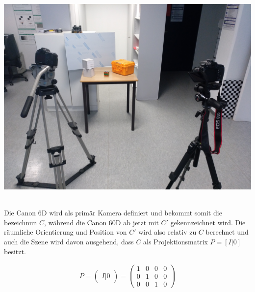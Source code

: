 \begin{minipage}{\linewidth}
	\centering
	\includegraphics[width=.7\linewidth]{images/SetUpSameResolution.jpg}
\end{minipage}\\


Die Canon 6D wird als primär Kamera definiert und bekommt somit die bezeichnun $C$, während die Canon 60D ab jetzt mit $C'$ gekennzeichnet wird. Die räumliche Orientierung und Position von $C'$ wird also relativ zu $C$ berechnet und auch die Szene wird davon ausgehend, dass $C$ als Projektionsmatrix $P=[I|0]$ besitzt.

\begin{gather}
	P=\begin{pmatrix}
	I|0
	\end{pmatrix} =
	\begin{pmatrix}
	1&0&0&0\\
	0&1&0&0\\
	0&0&1&0
	\end{pmatrix}
\end{gather}\\

